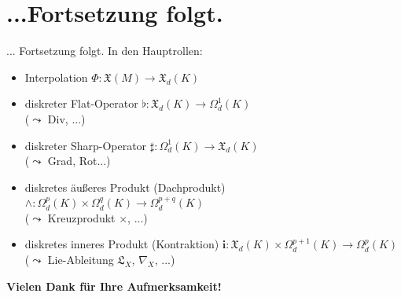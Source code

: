 \documentclass{beamer}
\begin{document}
  \section{...Fortsetzung folgt.}

  \begin{frame}
    \begin{block}{... Fortsetzung folgt.}
      In den Hauptrollen:
      \begin{itemize}
        \item Interpolation \( \Phi: \mathfrak{X}(M) \longrightarrow \mathfrak{X}_{d}(K) \)
        \item diskreter Flat-Operator \( \flat: \mathfrak{X}_{d}(K) \longrightarrow \Omega_{d}^{1}(K) \) \\
              (\( \leadsto  \) Div, ...)
        \item diskreter Sharp-Operator \( \sharp: \Omega_{d}^{1}(K) \longrightarrow \mathfrak{X}_{d}(K)\) \\
              (\( \leadsto  \) Grad, Rot...)
        \item diskretes äußeres Produkt (Dachprodukt) \( \wedge: \Omega_{d}^{p}(K)\times\Omega_{d}^{q}(K) \longrightarrow  \Omega_{d}^{p+q}(K) \) \\
              (\( \leadsto  \) Kreuzprodukt \( \times \), ...)
        \item diskretes inneres Produkt (Kontraktion) \( \mathbf{i}: \mathfrak{X}_{d}(K) \times \Omega_{d}^{p+1}(K) \longrightarrow \Omega_{d}^{p}(K)\) \\
              (\( \leadsto  \) Lie-Ableitung \( \mathfrak{L}_{X} \), \( \nabla_{X} \), ...)
      \end{itemize}
    \end{block}

    \begin{block}{}
      \centering \large \textbf{Vielen Dank für Ihre Aufmerksamkeit!}
    \end{block}
  \end{frame}
\end{document}
